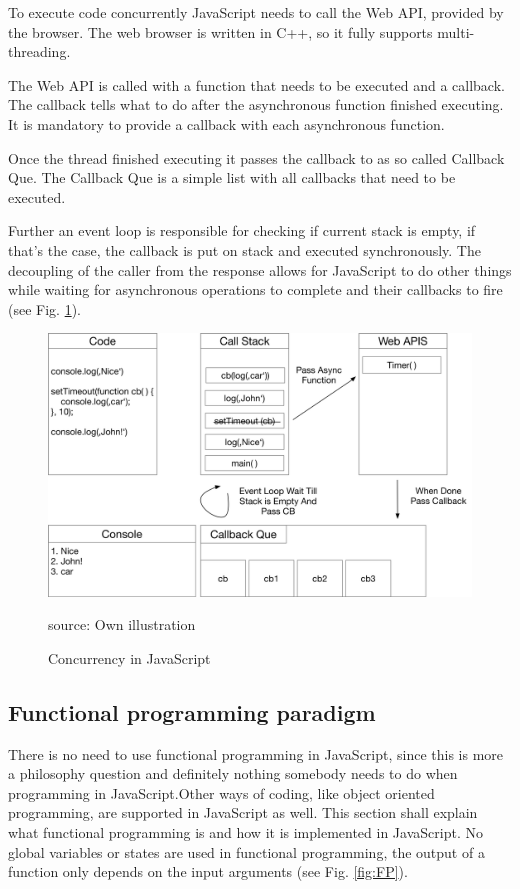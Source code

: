 To execute code concurrently JavaScript needs to call the Web API, provided by the browser. The web browser is written in C++, so it fully supports multi-threading.

The Web API is called with a function that needs to be executed and a callback.
The callback tells what to do after the asynchronous function finished executing. It is mandatory to provide a callback with each asynchronous function.

Once the thread finished executing it passes the callback to as so called Callback Que. The Callback Que is a simple list with all callbacks that need to be executed. 

Further an event loop is responsible for checking if current stack is empty, if that's the case, the callback is put on stack and executed synchronously. The decoupling of the caller from the response allows for JavaScript to do other things while waiting for asynchronous operations to complete and their callbacks to fire (see Fig. \ref{fig:CC}).

\begin{figure}[H]
	\centering
	\includegraphics[width=0.8\linewidth]{bilder/grundlagen/Concurrency.png}
	\caption{Concurrency in JavaScript} source: Own illustration
	\label{fig:CC}
\end{figure}

\subsection{Functional programming paradigm}
There is no need to use functional programming in JavaScript, since this is more a philosophy question and definitely nothing somebody needs to do when programming in JavaScript.Other ways of coding, like object oriented programming, are supported in JavaScript as well. This section shall explain what functional programming is and how it is implemented in JavaScript. No global variables or states are used in functional programming, the output of a function only depends on the input arguments  (see Fig. \ref{fig:FP}). \cite{Steyer2014JavaScript}

